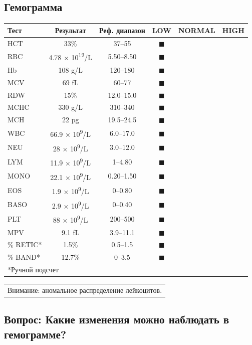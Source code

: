 \documentclass[a4paper,12pt]{book}
\begin{document}
\subsection*{Гемограмма}
\begin{tabular}{lccccc}
\toprule
Тест & Результат & Реф. диапазон & LOW & NORMAL & HIGH \\
\midrule
HCT & 33\% & 37--55 & $\blacksquare$ \\
RBC & 4.78 × 10\textsuperscript{12}/L & 5.50--8.50 & $\blacksquare$ \\
Hb & 108 g/L & 120--180 & $\blacksquare$ \\
MCV & 69 fL & 60--77 & $\blacksquare$ \\
RDW & 15\% & 12.0--15.0 & $\blacksquare$ \\
MCHC & 330 g/L & 310--340 & $\blacksquare$ \\
MCH & 22 pg & 19.5--24.5 & $\blacksquare$ \\
WBC & 66.9 × 10\textsuperscript{9}/L & 6.0--17.0 & $\blacksquare$ \\
NEU & 28 × 10\textsuperscript{9}/L & 3.0--12.0 & $\blacksquare$ \\
LYM & 11.9 × 10\textsuperscript{9}/L & 1--4.80 & $\blacksquare$ \\
MONO & 22.1 × 10\textsuperscript{9}/L & 0.20--1.50 & $\blacksquare$ \\
EOS & 1.9 × 10\textsuperscript{9}/L & 0--0.80 & $\blacksquare$ \\
BASO & 2.9 × 10\textsuperscript{9}/L & 0--0.40 & $\blacksquare$ \\
PLT & 88 × 10\textsuperscript{9}/L & 200--500 & $\blacksquare$ \\
MPV & 9.1 fL & 3.9--11.1 & $\blacksquare$ \\
\% RETIC* & 1.5\% & 0.5--1.5 & $\blacksquare$ \\
\% BAND* & 12.7\% & 0--3.5 & $\blacksquare$ \\
\bottomrule
\multicolumn{6}{l}{*Ручной подсчет}
\end{tabular}

\begin{tabular}{l}
Внимание: аномальное распределение лейкоцитов. \\
\end{tabular}

\subsection*{Вопрос: Какие изменения можно наблюдать в гемограмме?}
\end{document}
